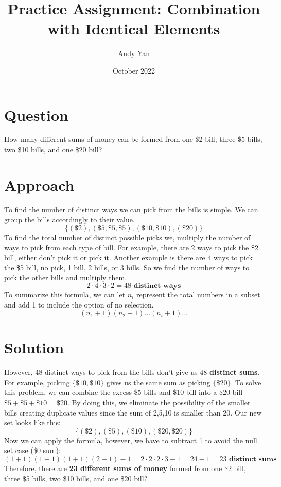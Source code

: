 \documentclass{article}
\title{Practice Assignment: Combination with Identical
Elements}
\author{Andy Yan}
\date{October 2022}
\begin{document}
\maketitle

\section{Question}
How many different sums of money can be
formed from one \$2 bill, three \$5 bills, two
\$10 bills, and one \$20 bill?

\section{Approach}
To find the number of distinct ways we can pick from the bills is simple. We can group the bills accordingly to their value.
\[\{(\$2),(\$5, \$5, \$5),(\$10, \$10),(\$20)\}\]
To find the total number of distinct possible picks we, multiply the number of ways to pick from each type of bill. For example, there are 2 ways to pick the \$2 bill, either don't pick it or pick it. Another example is there are 4 ways to pick the \$5 bill, no pick, 1 bill, 2 bills, or 3 bills. So we find the number of ways to pick the other bills and multiply them.
\[2\cdot4\cdot3\cdot2 = 48 \textbf{ distinct ways}\]
To summarize this formula, we can let \(n_i\) represent the total numbers in a subset and add 1 to include the option of no selection.
\[(n_1 + 1)(n_2 + 1)...(n_i + 1)...\]

\section{Solution}

However, 48 distinct ways to pick from the bills don't give us 48\textbf{ distinct sums}. For example, picking \(\{\$10,\$10\}\) gives us the same sum as picking \(\{\$20\}\). To solve this problem, we can combine the excess \$5 bills and \$10 bill into a \$20 bill \(\$5 + \$5 + \$10 = \$20\). By doing this, we eliminate the possibility of the smaller bills creating duplicate values since the sum of 2,5,10 is smaller than 20. Our new set looks like this:
\[\{(\$2),(\$5),(\$10),(\$20, \$20)\}\]
Now we can apply the formula, however, we have to subtract 1 to avoid the null set case (\$0 sum):
\[(1 + 1)(1 + 1)(1 + 1)(2 + 1) - 1 = 2\cdot2\cdot2\cdot3 - 1 = 24 - 1 = 23 \textbf{ distinct sums}\]
Therefore, there are \textbf{23 different sums of money} formed from one \$2 bill, three \$5 bills, two
\$10 bills, and one \$20 bill?
\end{document}
